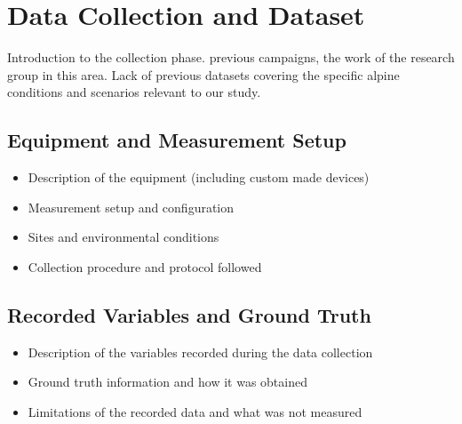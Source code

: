 \chapter{Data Collection and Dataset}
Introduction to the collection phase. previous campaigns, the work of the research group in this area.
Lack of previous datasets covering the specific alpine conditions and scenarios relevant to our study.

\section{Equipment and Measurement Setup}
\begin{itemize}
\item Description of the equipment (including custom made devices)
\item Measurement setup and configuration
\item Sites and environmental conditions
\item Collection procedure and protocol followed
\end{itemize}

\section{Recorded Variables and Ground Truth}
\begin{itemize}
\item Description of the variables recorded during the data collection
\item Ground truth information and how it was obtained
\item Limitations of the recorded data and what was not measured
\end{itemize}
